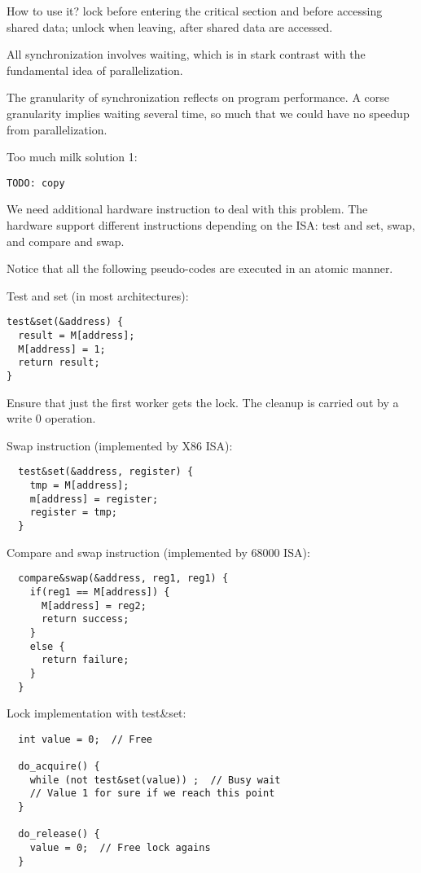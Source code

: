 How to use it? lock before entering the critical section and before accessing shared data; unlock when leaving, after shared data are accessed.

All synchronization involves waiting, which is in stark contrast with the fundamental idea of parallelization.

The granularity of synchronization reflects on program performance.
A corse granularity implies waiting several time, so much that we could have no speedup from parallelization.

Too much milk solution 1:
\begin{verbatim}
TODO: copy
\end{verbatim}

We need additional hardware instruction to deal with this problem.
The hardware support different instructions depending on the ISA: test and set, swap, and compare and swap.

Notice that all the following pseudo-codes are executed in an atomic manner.

Test and set (in most architectures):
\begin{verbatim}
test&set(&address) {
  result = M[address];
  M[address] = 1;
  return result;
}
\end{verbatim}

Ensure that just the first worker gets the lock. The cleanup is carried out by a write 0 operation.

Swap instruction (implemented by X86 ISA):
\begin{verbatim}
  test&set(&address, register) {
    tmp = M[address];
    m[address] = register;
    register = tmp;
  }
\end{verbatim}

Compare and swap instruction (implemented by 68000 ISA):
\begin{verbatim}
  compare&swap(&address, reg1, reg1) {
    if(reg1 == M[address]) {
      M[address] = reg2;
      return success;
    }
    else {
      return failure;
    }
  }
\end{verbatim}

Lock implementation with test&set:
\begin{verbatim}
  int value = 0;  // Free
  
  do_acquire() {
    while (not test&set(value)) ;  // Busy wait
    // Value 1 for sure if we reach this point 
  }
  
  do_release() {
    value = 0;  // Free lock agains
  }
\end{verbatim}


